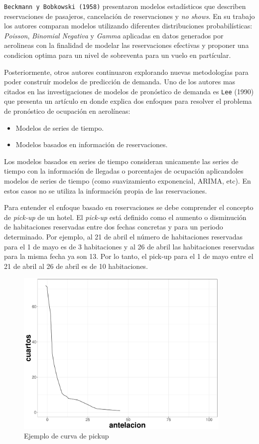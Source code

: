 {\texttt{Beckmann y Bobkowski (1958)} presentaron modelos estadísticos que describen reservaciones de pasajeros, cancelación de reservaciones y \emph{no shows}. En su trabajo los autores comparan modelos utilizando diferentes distribuciones probabilísticas: \emph{Poisson}, \emph{Binomial Negativa} y \emph{Gamma} aplicadas en datos generados por aerolineas con la finalidad de modelar las reservaciones efectivas y proponer una condicion optima para un nivel de sobreventa para un vuelo en partícular.

Posteriormente, otros autores continuaron explorando nuevas metodologías para poder construír modelos de predicción de demanda. Uno de los autores mas citados en las investigaciones de modelos de pronóstico de demanda es \texttt{Lee} (1990) que presenta un artículo en donde explica dos enfoques para resolver el problema de pronóstico de ocupación en aerolíneas:
\begin{itemize}
  \item Modelos de series de tiempo.
  \item Modelos basados en información de reservaciones.
\end{itemize}

Los modelos basados en series de tiempo consideran unicamente las series de tiempo con la información de llegadas o porcentajes de ocupación aplicandoles modelos de series de tiempo (como suavizamiento exponencial, ARIMA, etc). En estos casos no se utiliza la información propia de las reservaciones.


Para entender el enfoque basado en reservaciones se debe comprender el concepto de \emph{pick-up} de un hotel. El \emph{pick-up} está definido como el aumento o disminución de habitaciones reservadas entre dos fechas concretas y para un periodo determinado. Por ejemplo, al 21 de abril el número de habitaciones reservadas para el 1 de mayo es de 3 habitaciones y al 26 de abril las habitaciones reservadas para la misma fecha ya son 13.  Por lo tanto, el pick-up para el 1 de mayo entre el 21 de abril al 26 de abril es de 10 habitaciones.

\begin{figure}[H]
  \centering
      \includegraphics[width=\maxwidth,height=8cm]{figures/pickupEjemplo.pdf} 
  \caption{Ejemplo de curva de pickup}
\end{figure}

}
